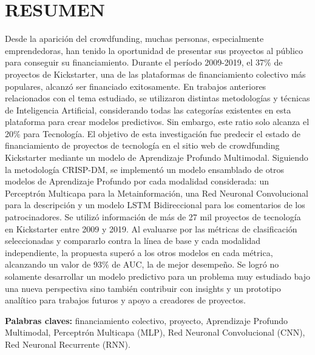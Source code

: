
\chapter*{RESUMEN}

Desde la aparición del crowdfunding, muchas personas, especialmente emprendedoras, han tenido la oportunidad de presentar sus proyectos al público para conseguir su financiamiento. Durante el período 2009-2019, el 37\% de proyectos de Kickstarter, una de las plataformas de financiamiento colectivo más populares, alcanzó ser financiado exitosamente. En trabajos anteriores relacionados con el tema estudiado, se utilizaron distintas metodologías y técnicas de Inteligencia Artificial, considerando todas las categorías existentes en esta plataforma para crear modelos predictivos. Sin embargo, este ratio solo alcanza el 20\% para Tecnología. El objetivo de esta investigación fue predecir el estado de financiamiento de proyectos de tecnología en el sitio web de crowdfunding Kickstarter mediante un modelo de Aprendizaje Profundo Multimodal. Siguiendo la metodología CRISP-DM, se implementó un modelo ensamblado de otros modelos de Aprendizaje Profundo por cada modalidad considerada: un Perceptrón Multicapa para la Metainformación, una Red Neuronal Convolucional para la descripción y un modelo LSTM Bidireccional para los comentarios de los patrocinadores. Se utilizó información de más de 27 mil proyectos de tecnología en Kickstarter entre 2009 y 2019. Al evaluarse por las métricas de clasificación seleccionadas y compararlo contra la línea de base y cada modalidad independiente, la propuesta superó a los otros modelos en cada métrica, alcanzando un valor de 93\% de AUC, la de mejor desempeño. Se logró no solamente desarrollar un modelo predictivo para un problema muy estudiado bajo una nueva perspectiva sino también contribuir con insights y un prototipo analítico para trabajos futuros y apoyo a creadores de proyectos.

\textbf{Palabras claves: } financiamiento colectivo, proyecto, Aprendizaje Profundo Multimodal, Perceptrón Multicapa (MLP), Red Neuronal Convolucional (CNN), Red Neuronal Recurrente (RNN).

\clearpage
